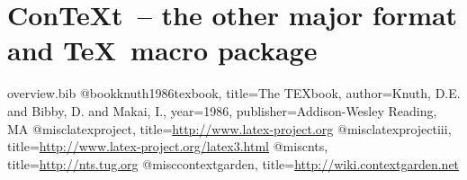 \documentclass{scrartcl}
\def\ConTeXt{Con\TeX{}t}
\def\mynode#1#2#3#4{
  \node (#1) at (#2) {
    \cooltooltip{#1}{#3}{#3}{}{#4\strut}
  };
}
\begin{document}
\newpage
\section*{\ConTeXt\ -- the other major format and \TeX\ macro package}

\newpage

\begin{filecontents}{overview.bib}
@book{knuth1986texbook,
  title={{The TEXbook}},
  author={Knuth, D.E. and Bibby, D. and Makai, I.},
  year={1986},
  publisher={Addison-Wesley Reading, MA}
}
@misc{latexproject,
  title={\url{http://www.latex-project.org}}
}
@misc{latexprojectiii,
  title={\url{http://www.latex-project.org/latex3.html}}
}
@misc{nts,
  title={\url{http://nts.tug.org}}
}
@misc{contextgarden,
  title={\url{http://wiki.contextgarden.net}}
}

\end{filecontents}

\normalsize

\nocite{knuth1986texbook,latexproject,latexproject3,nts,contextgarden}

\end{document}
